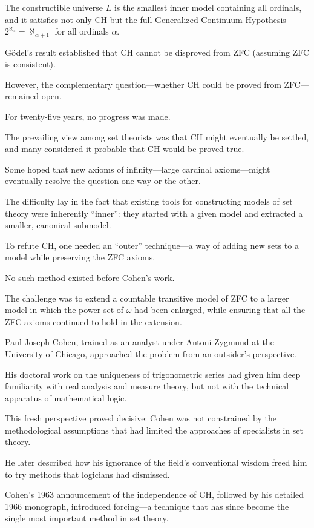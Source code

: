 The constructible universe $L$ is the smallest inner model containing all ordinals, and it satisfies not only CH but the full Generalized Continuum Hypothesis $2^{\aleph_\alpha} = \aleph_{\alpha+1}$ for all ordinals $\alpha$.

Gödel's result established that CH cannot be disproved from ZFC (assuming ZFC is consistent).

However, the complementary question---whether CH could be proved from ZFC---remained open.

For twenty-five years, no progress was made.

The prevailing view among set theorists was that CH might eventually be settled, and many considered it probable that CH would be proved true.

Some hoped that new axioms of infinity---large cardinal axioms---might eventually resolve the question one way or the other.

The difficulty lay in the fact that existing tools for constructing models of set theory were inherently ``inner'': they started with a given model and extracted a smaller, canonical submodel.

To refute CH, one needed an ``outer'' technique---a way of adding new sets to a model while preserving the ZFC axioms.

No such method existed before Cohen's work.

The challenge was to extend a countable transitive model of ZFC to a larger model in which the power set of $\omega$ had been enlarged, while ensuring that all the ZFC axioms continued to hold in the extension.

Paul Joseph Cohen, trained as an analyst under Antoni Zygmund at the University of Chicago, approached the problem from an outsider's perspective.

His doctoral work on the uniqueness of trigonometric series had given him deep familiarity with real analysis and measure theory, but not with the technical apparatus of mathematical logic.

This fresh perspective proved decisive: Cohen was not constrained by the methodological assumptions that had limited the approaches of specialists in set theory.

He later described how his ignorance of the field's conventional wisdom freed him to try methods that logicians had dismissed.

Cohen's 1963 announcement of the independence of CH, followed by his detailed 1966 monograph, introduced forcing---a technique that has since become the single most important method in set theory.

